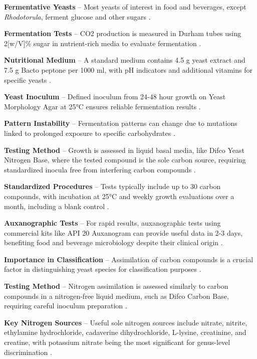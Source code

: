 \textbf{Fermentative Yeasts} – Most yeasts of interest in food and beverages, except \textit{Rhodotorula}, ferment glucose and other sugars \cite*{L2-YeastClass}.

\textbf{Fermentation Tests} – CO2 production is measured in Durham tubes using 2[w/V]\% sugar in nutrient-rich media to evaluate fermentation \cite*{L2-YeastClass}.

\textbf{Nutritional Medium} – A standard medium contains 4.5 g yeast extract and 7.5 g Bacto peptone per 1000 ml, with pH indicators and additional vitamins for specific yeasts \cite*{L2-YeastClass}.

\textbf{Yeast Inoculum} – Defined inoculum from 24-48 hour growth on Yeast Morphology Agar at 25°C ensures reliable fermentation results \cite*{L2-YeastClass}.

\textbf{Pattern Instability} – Fermentation patterns can change due to mutations linked to prolonged exposure to specific carbohydrates \cite*{L2-YeastClass}.


\textbf{Testing Method} – Growth is assessed in liquid basal media, like Difco Yeast Nitrogen Base, where the tested compound is the sole carbon source, requiring standardized inocula free from interfering carbon compounds \cite*{L2-YeastClass}.

\textbf{Standardized Procedures} – Tests typically include up to 30 carbon compounds, with incubation at 25°C and weekly growth evaluations over a month, including a blank control \cite*{L2-YeastClass}.

\textbf{Auxanographic Tests} – For rapid results, auxanographic tests using commercial kits like API 20 Auxanogram can provide useful data in 2-3 days, benefiting food and beverage microbiology despite their clinical origin \cite*{L2-YeastClass}.

\textbf{Importance in Classification} – Assimilation of carbon compounds is a crucial factor in distinguishing yeast species for classification purposes \cite*{L2-YeastClass}.



\textbf{Testing Method} – Nitrogen assimilation is assessed similarly to carbon compounds in a nitrogen-free liquid medium, such as Difco Carbon Base, requiring careful inoculum preparation \cite*{L2-YeastClass}.

\textbf{Key Nitrogen Sources} – Useful sole nitrogen sources include nitrate, nitrite, ethylamine hydrochloride, cadaverine dihydrochloride, L-lysine, creatinine, and creatine, with potassium nitrate being the most significant for genus-level discrimination \cite*{L2-YeastClass}.

